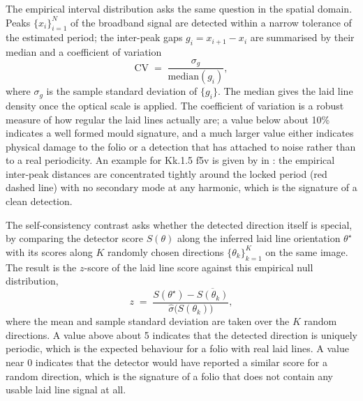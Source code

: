 The empirical interval distribution asks the same question in the
spatial domain. Peaks $\{x_i\}_{i=1}^{N}$ of the broadband signal are
detected within a narrow tolerance of the estimated period; the
inter-peak gaps $g_i = x_{i+1} - x_i$ are summarised by their median
and a coefficient of variation
\begin{equation}
  \mathrm{CV} \;=\; \frac{\sigma_g}{\mathrm{median}(g_i)},
  \label{eq:interval_cv}
\end{equation}
where $\sigma_g$ is the sample standard deviation of $\{g_i\}$. The
median gives the laid line density once the optical scale is applied.
The coefficient of variation is a robust measure of how regular the
laid lines actually are; a value below about 10\% indicates
a well formed mould signature, and a much larger value either
indicates physical damage to the folio or a detection that has
attached to noise rather than to a real periodicity. An example for
Kk.1.5 f5v is given by  in
: the empirical inter-peak distances are
concentrated tightly around the locked period (red dashed line) with
no secondary mode at any harmonic, which is the signature of a clean
detection.

The self-consistency contrast asks whether the detected
direction itself is special, by comparing the detector score $S(\theta)$
along the inferred laid line orientation $\theta^\star$ with its
scores along $K$ randomly chosen directions
$\{\theta_k\}_{k=1}^{K}$ on the same image. The result is the
$z$-score of the laid line score against this empirical null
distribution,
\begin{equation}
  z \;=\; \frac{S(\theta^\star) - \overline{S(\theta_k)}}
                {\widehat{\sigma}\bigl(S(\theta_k)\bigr)},
  \label{eq:self_contrast_z}
\end{equation}
where the mean and sample standard deviation are taken over the $K$
random directions. A value above about 5 indicates that the
detected direction is uniquely periodic, which is the expected
behaviour for a folio with real laid lines. A value near 0
indicates that the detector would have reported a similar score for
a random direction, which is the signature of a folio that does not
contain any usable laid line signal at all.

